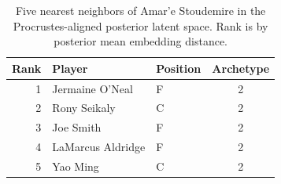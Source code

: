 \begin{table}[htbp]
  \centering\small
  \begin{tabular}{rllc}
    \toprule
    Rank & Player & Position & Archetype \\
    \midrule
    1 & Jermaine O'Neal & F & 2 \\
    2 & Rony Seikaly & C & 2 \\
    3 & Joe Smith & F & 2 \\
    4 & LaMarcus Aldridge & F & 2 \\
    5 & Yao Ming & C & 2 \\
    \bottomrule
  \end{tabular}
  \caption{Five nearest neighbors of Amar'e Stoudemire in the Procrustes-aligned posterior latent space. Rank is by posterior mean embedding distance.}
  \label{tab:Amar_e_Stoudemire_neighbors}
\end{table}

